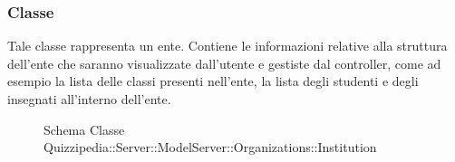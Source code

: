 \subsubsection{Classe }
Tale classe rappresenta un ente. Contiene le informazioni relative alla struttura dell'ente che saranno visualizzate dall'utente e gestiste dal controller, come ad esempio la lista delle classi presenti nell'ente, la lista degli studenti e degli insegnati all'interno dell'ente.
\begin{figure}[H]
\centering
\noindent{}
\caption[Schema Classe Institution]{Schema Classe Quizzipedia::Server::ModelServer::Organizations::Institution}
\end{figure}
